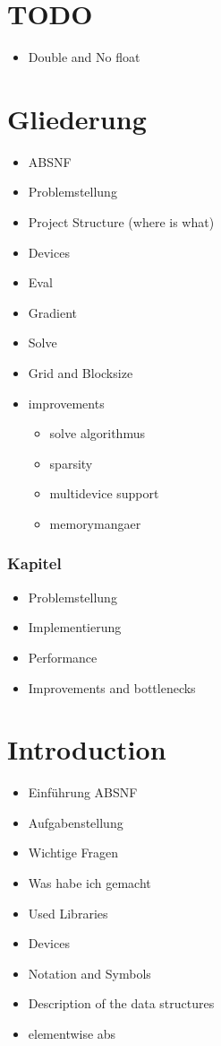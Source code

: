 \section{TODO}
\begin{itemize}
	\item Double and No float
\end{itemize}
\section{Gliederung}
\begin{itemize}
	\item ABSNF
	\item Problemstellung
	\item Project Structure (where is what)
	\item Devices
	\item Eval
	\item Gradient
	\item Solve
	\item Grid and Blocksize
	\item improvements
	\begin{itemize}
		\item solve algorithmus
		\item sparsity
		\item multidevice support
		\item memorymangaer
	\end{itemize}
\end{itemize}

\subsubsection{Kapitel}
\begin{itemize}
	\item Problemstellung
	\item Implementierung
	\item Performance
	\item Improvements and bottlenecks
\end{itemize}

\section{Introduction}
\begin{itemize}
	\item Einführung ABSNF
	\item Aufgabenstellung
	\item Wichtige Fragen
	\item Was habe ich gemacht
	\item Used Libraries
	\item Devices
	\item Notation and Symbols
	\item Description of the data structures
	\item elementwise abs
\end{itemize}

